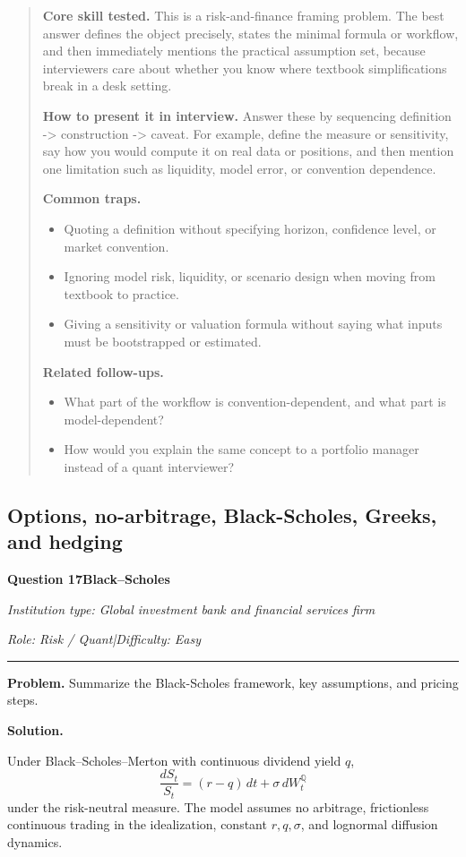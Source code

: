 \documentclass[11pt,letterpaper,openany]{book}
\newenvironment{EditorialNote}
  {\begin{quote}\small\setlength{\parskip}{0.25em}}
  {\end{quote}}
\newcommand{\QuestionSpacer}{\vspace{0.4em}}
\newcommand{\InterviewQuestionHeader}[5]{%
  \vspace{1.0em}%
  {\large\bfseries #1\enspace #4\par}%
  {\small\itshape Institution type: #2\par}%
  {\small\itshape Role: #3\enspace |\enspace Difficulty: #5\par}%
  \vspace{0.25em}\hrule\vspace{0.45em}%
}
\begin{document}
\begin{EditorialNote}


\textbf{Core skill tested.} This is a risk-and-finance framing problem. The best answer defines the object precisely, states the minimal formula or workflow, and then immediately mentions the practical assumption set, because interviewers care about whether you know where textbook simplifications break in a desk setting.

\textbf{How to present it in interview.} Answer these by sequencing definition -> construction -> caveat. For example, define the measure or sensitivity, say how you would compute it on real data or positions, and then mention one limitation such as liquidity, model error, or convention dependence.

\textbf{Common traps.}
\begin{itemize}
\item Quoting a definition without specifying horizon, confidence level, or market convention.
\item Ignoring model risk, liquidity, or scenario design when moving from textbook to practice.
\item Giving a sensitivity or valuation formula without saying what inputs must be bootstrapped or estimated.
\end{itemize}

\textbf{Related follow-ups.}
\begin{itemize}
\item What part of the workflow is convention-dependent, and what part is model-dependent?
\item How would you explain the same concept to a portfolio manager instead of a quant interviewer?
\end{itemize}


\end{EditorialNote}
\QuestionSpacer

\subsection{Options, no-arbitrage, Black-Scholes, Greeks, and hedging}

\InterviewQuestionHeader{Question 17}{Global investment bank and financial services firm}{Risk / Quant}{Black–Scholes}{Easy}
\textbf{Problem.} Summarize the Black-Scholes framework, key assumptions, and pricing steps.

\textbf{Solution.}


Under Black--Scholes--Merton with continuous dividend yield \(q\),
\[
\frac{dS_t}{S_t}=(r-q)\,dt+\sigma\,dW_t^{\mathbb Q}
\]
under the risk-neutral measure. The model assumes no arbitrage, frictionless continuous trading in the idealization, constant \(r,q,\sigma\), and lognormal diffusion dynamics.
\end{document}
